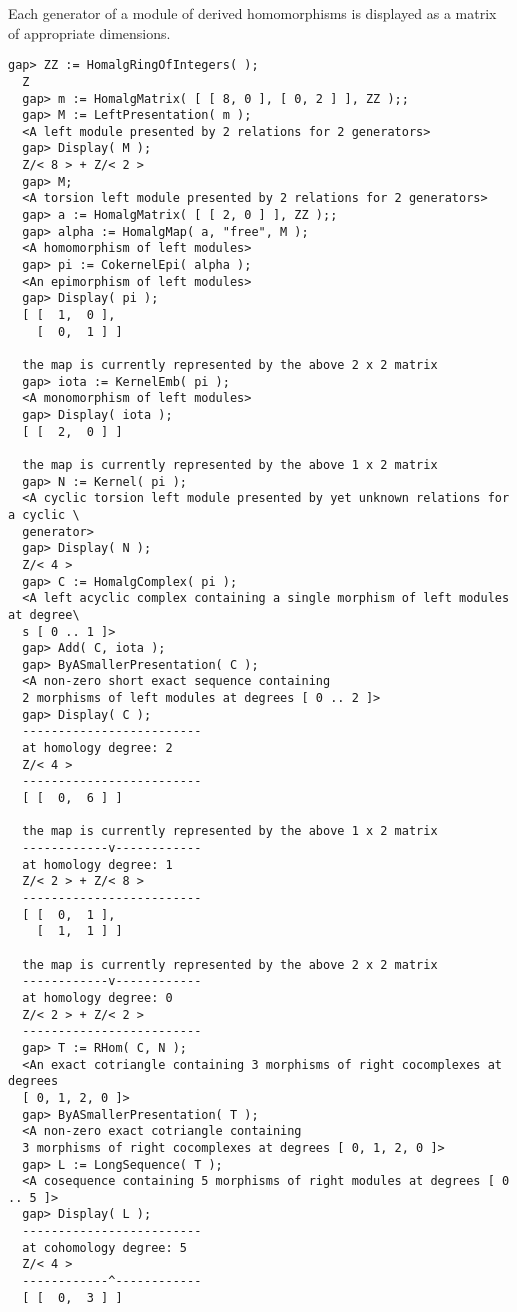 \documentclass[a4paper,11pt]{report}
\begin{document}
{{{ Each generator of a module of derived homomorphisms is displayed as a matrix
of appropriate dimensions. 
\begin{Verbatim}[fontsize=\small,frame=single,label=Example]
  gap> ZZ := HomalgRingOfIntegers( );
  Z
  gap> m := HomalgMatrix( [ [ 8, 0 ], [ 0, 2 ] ], ZZ );;
  gap> M := LeftPresentation( m );
  <A left module presented by 2 relations for 2 generators>
  gap> Display( M );
  Z/< 8 > + Z/< 2 >
  gap> M;
  <A torsion left module presented by 2 relations for 2 generators>
  gap> a := HomalgMatrix( [ [ 2, 0 ] ], ZZ );;
  gap> alpha := HomalgMap( a, "free", M );
  <A homomorphism of left modules>
  gap> pi := CokernelEpi( alpha );
  <An epimorphism of left modules>
  gap> Display( pi );
  [ [  1,  0 ],
    [  0,  1 ] ]
  
  the map is currently represented by the above 2 x 2 matrix
  gap> iota := KernelEmb( pi );
  <A monomorphism of left modules>
  gap> Display( iota );
  [ [  2,  0 ] ]
  
  the map is currently represented by the above 1 x 2 matrix
  gap> N := Kernel( pi );
  <A cyclic torsion left module presented by yet unknown relations for a cyclic \
  generator>
  gap> Display( N );
  Z/< 4 >
  gap> C := HomalgComplex( pi );
  <A left acyclic complex containing a single morphism of left modules at degree\
  s [ 0 .. 1 ]>
  gap> Add( C, iota );
  gap> ByASmallerPresentation( C );
  <A non-zero short exact sequence containing
  2 morphisms of left modules at degrees [ 0 .. 2 ]>
  gap> Display( C );
  -------------------------
  at homology degree: 2
  Z/< 4 >
  -------------------------
  [ [  0,  6 ] ]
  
  the map is currently represented by the above 1 x 2 matrix
  ------------v------------
  at homology degree: 1
  Z/< 2 > + Z/< 8 >
  -------------------------
  [ [  0,  1 ],
    [  1,  1 ] ]
  
  the map is currently represented by the above 2 x 2 matrix
  ------------v------------
  at homology degree: 0
  Z/< 2 > + Z/< 2 >
  -------------------------
  gap> T := RHom( C, N );
  <An exact cotriangle containing 3 morphisms of right cocomplexes at degrees
  [ 0, 1, 2, 0 ]>
  gap> ByASmallerPresentation( T );
  <A non-zero exact cotriangle containing
  3 morphisms of right cocomplexes at degrees [ 0, 1, 2, 0 ]>
  gap> L := LongSequence( T );
  <A cosequence containing 5 morphisms of right modules at degrees [ 0 .. 5 ]>
  gap> Display( L );
  -------------------------
  at cohomology degree: 5
  Z/< 4 >
  ------------^------------
  [ [  0,  3 ] ]
  

\end{Verbatim}}}}
\end{document}
